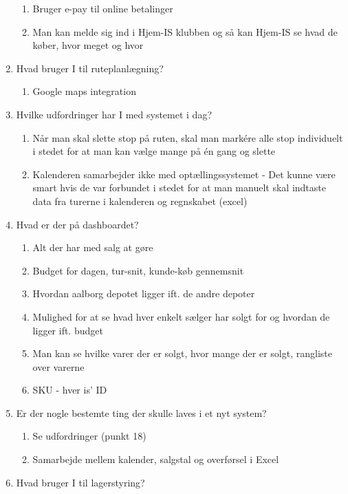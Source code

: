 \begin{enumerate}
\begin{enumerate}
        \item Bruger e-pay til online betalinger
        \item Man kan melde sig ind i Hjem-IS klubben og så kan Hjem-IS se hvad de køber, hvor meget og hvor
    \end{enumerate}
    \item Hvad bruger I til ruteplanlægning?
    \begin{enumerate}
        \item Google maps integration
    \end{enumerate}
    \item Hvilke udfordringer har I med systemet i dag?
    \begin{enumerate}
        \item Når man skal slette stop på ruten, skal man markére alle stop individuelt i stedet for at man kan vælge mange på én gang og slette
        \item Kalenderen samarbejder ikke med optællingssystemet - Det kunne være smart hvis de var forbundet i stedet for at man manuelt skal indtaste data fra turerne i kalenderen og regnskabet (excel)
    \end{enumerate}
    \item Hvad er der på dashboardet?
    \begin{enumerate}
        \item Alt der har med salg at gøre
        \item Budget for dagen, tur-snit, kunde-køb gennemsnit
        \item Hvordan aalborg depotet ligger ift. de andre depoter
        \item Mulighed for at se hvad hver enkelt sælger har solgt for og hvordan de ligger ift. budget
        \item Man kan se hvilke varer der er solgt, hvor mange der er solgt, rangliste over varerne
        \item SKU - hver is’ ID
    \end{enumerate}
    \item Er der nogle bestemte ting der skulle laves i et nyt system?
    \begin{enumerate}
        \item Se udfordringer (punkt 18)
        \item Samarbejde mellem kalender, salgstal og overførsel i Excel
    \end{enumerate}
    \item Hvad bruger I til lagerstyring?
    \begin{enumerate}

\end{enumerate}
\end{enumerate}
